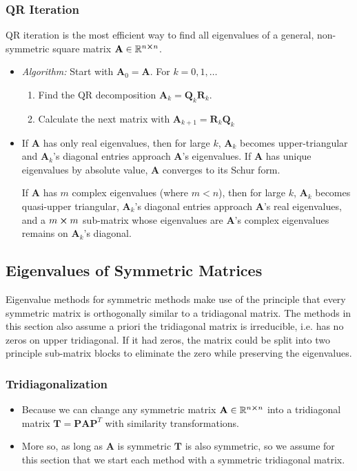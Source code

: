 \documentclass[11pt, a4paper]{article}
\newcommand{\R}{\mathbb{R}} %
\newcommand{\mat}[1]{\mathbf{#1}} %
\begin{document}
\subsubsection{QR Iteration}
QR iteration is the most efficient way to find all eigenvalues of a general, non-symmetric square matrix $ \mat{A} \in \R^{n \cross n} $.
\begin{itemize}
	\item \textit{Algorithm:} Start with $ \mat{A}_0 = \mat{A} $. For $ k = 0, 1, \dots $ 
	\begin{enumerate}
		\item Find the QR decomposition $ \mat{A}_k = \mat{Q}_k \mat{R}_k $. 
		\item Calculate the next matrix with $ \mat{A}_{k+1} = \mat{R}_k \mat{Q}_k $
	\end{enumerate}
		
	\item If $ \mat{A} $ has only real eigenvalues, then for large $ k $, $ \mat{A}_k $ becomes upper-triangular and $ \mat{A}_{k} $'s diagonal entries approach $ \mat{A} $'s eigenvalues. If $ \mat{A} $ has unique eigenvalues by absolute value, $ \mat{A} $ converges to its Schur form.
	
	If $ \mat{A} $ has $ m $ complex eigenvalues (where $ m < n $), then for large $ k $, $ \mat{A}_k $ becomes quasi-upper triangular, $ \mat{A}_{k} $'s diagonal entries approach $ \mat{A} $'s real eigenvalues, and a $ m \cross m $ sub-matrix whose eigenvalues are $ \mat{A} $'s complex eigenvalues remains on $ \mat{A}_{k} $'s diagonal.
	
	
\end{itemize}


\subsection{Eigenvalues of Symmetric Matrices}
Eigenvalue methods for symmetric methods make use of the principle that every symmetric matrix is orthogonally similar to a tridiagonal matrix. The methods in this section also assume a priori the tridiagonal matrix is irreducible, i.e. has no zeros on upper tridiagonal. If it had zeros, the matrix could be split into two principle sub-matrix blocks to eliminate the zero while preserving the eigenvalues.

\subsubsection{Tridiagonalization}
\begin{itemize}
	\item Because we can change any symmetric matrix $ \mat{A} \in \R^{n \cross n}$ into a tridiagonal matrix $ \mat{T} = \mat{P}\mat{A}\mat{P}^{T} $ with similarity transformations.
	
	\item More so, as long as $ \mat{A} $ is symmetric $ \mat{T} $ is also symmetric, so we assume for this section that we start each method with a symmetric tridiagonal matrix. 
	
\end{itemize}
\end{document}

